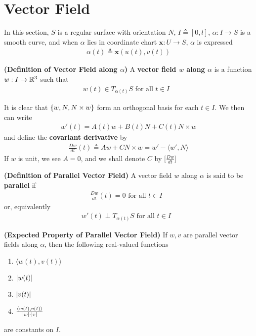 \documentclass{report}
\begin{document}
\section{Vector Field}
\begin{mdframed}
In this section, $S$ is a regular surface with orientation $N$, $I\triangleq [0,l]$, $\alpha :I\rightarrow S$ is a smooth curve, and when $\alpha $ lies in coordinate chart $\textbf{x}:U\rightarrow S$, $\alpha $ is expressed 
\begin{align*}
\alpha (t)\triangleq \textbf{x}(u(t),v(t))
\end{align*}
\end{mdframed}
\begin{definition}
  \textbf{(Definition of Vector Field along $\alpha $)} A \textbf{vector field $w$ along $\alpha $} is a function $w:I\rightarrow \mathbb{R}^3$ such that 
\begin{align*}
w(t)\in T_{\alpha (t)}S\text{ for all $t\in I$ }  
\end{align*}
\end{definition}
\begin{mdframed}
It is clear that $\{ w,N,N\times w \}$ form an orthogonal basis for each $t\in I$. We then can write 
\begin{align*}
w'(t)=A(t)w+ B(t)N+C(t)N\times w
\end{align*}
and define the \textbf{covariant derivative} by
\begin{align*}
\frac{Dw}{dt}(t)\triangleq Aw+ CN\times w= w'- \langle w', N\rangle 
\end{align*}
If $w$ is unit, we see $A=0$, and we shall denote $C$ by $\Big[\frac{Dw}{dt} \Big]$  
\end{mdframed}
\begin{definition}
\textbf{(Definition of Parallel Vector Field)} A vector field $w$ along $\alpha $ is said to be \textbf{parallel} if 
\begin{align*}
  \frac{Dw}{dt}(t)=0\text{ for all $t\in I$ }
\end{align*}
or, equivalently
\begin{align*}
w'(t)\perp T_{\alpha (t)}S\text{ for all $t\in I$ }
\end{align*}
\end{definition}
\begin{theorem}
\textbf{(Expected Property of Parallel Vector Field)} If $w,v$ are parallel vector fields along  $\alpha$, then the following real-valued functions 
\begin{enumerate}[label=(\alph*)]
  \item $\langle w(t),v(t)\rangle $ 
  \item $\left|w(t)\right|$ 
  \item $\left|v(t)\right|$ 
  \item $\frac{\langle w(t),v(t)\rangle }{\left|w\right|\cdot \left|v\right|}$ 
\end{enumerate}
are constants on $I$.
\end{theorem}
\end{document}
